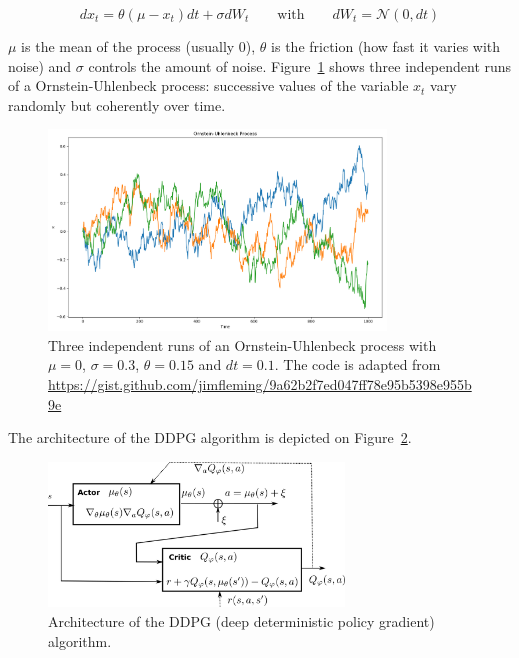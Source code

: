 \documentclass[
  letterpaper,
  DIV=11,
  numbers=noendperiod]{scrreprt}
\begin{document}
\[ dx_t = \theta (\mu - x_t) dt + \sigma dW_t \qquad \text{with} \qquad dW_t = \mathcal{N}(0, dt)\]

\(\mu\) is the mean of the process (usually 0), \(\theta\) is the
friction (how fast it varies with noise) and \(\sigma\) controls the
amount of noise. Figure~\ref{fig-OU} shows three independent runs of a
Ornstein-Uhlenbeck process: successive values of the variable \(x_t\)
vary randomly but coherently over time.

\begin{figure}

{\centering \includegraphics[width=0.8\textwidth,height=\textheight]{./img/OU.png}

}

\caption{\label{fig-OU}Three independent runs of an Ornstein-Uhlenbeck
process with \(\mu=0\), \(\sigma=0.3\), \(\theta=0.15\) and \(dt=0.1\).
The code is adapted from
\url{https://gist.github.com/jimfleming/9a62b2f7ed047ff78e95b5398e955b9e}}

\end{figure}

The architecture of the DDPG algorithm is depicted on
Figure~\ref{fig-ddpg}.

\begin{figure}

{\centering \includegraphics[width=0.7\textwidth,height=\textheight]{./img/ddpg.png}

}

\caption{\label{fig-ddpg}Architecture of the DDPG (deep deterministic
policy gradient) algorithm.}

\end{figure}
\end{document}
